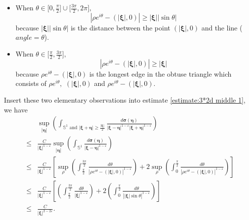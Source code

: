 \documentclass[reqno]{amsart}
\theoremstyle{plain}
\numberwithin{equation}{section}
\begin{document}
\begin{itemize}
\item When $\theta \in \lbrack 0,\frac{\pi }{2}]\cup \lbrack \frac{3\pi }{2},2\pi ],$\begin{equation*}
\left\vert \rho e^{i\theta }-(\left\vert \mathbf{\xi }\right\vert
,0)\right\vert \geqslant \left\vert \mathbf{\xi }\right\vert \left\vert \sin
\theta \right\vert
\end{equation*}because $\left\vert \mathbf{\xi }\right\vert \left\vert \sin \theta
\right\vert $ is the distance between the point $(\left\vert \mathbf{\xi }\right\vert ,0)$ and the line ($angle=\theta $).

\item When $\theta \in \lbrack \frac{\pi }{2},\frac{3\pi }{2}],$\begin{equation*}
\left\vert \rho e^{i\theta }-(\left\vert \mathbf{\xi }\right\vert
,0)\right\vert \geqslant \left\vert \mathbf{\xi }\right\vert
\end{equation*}because $\rho e^{i\theta }-(\left\vert \mathbf{\xi }\right\vert ,0)$ is the
longest edge in the obtuse triangle which consists of $\rho e^{i\theta }\mathbf{,}$ $(\left\vert \mathbf{\xi }\right\vert ,0)$ and $\rho e^{i\theta
}-(\left\vert \mathbf{\xi }\right\vert ,0).$
\end{itemize}

Insert these two elementary observations into estimate \ref{estimate:3*2d
middle 1}, we have 
\begin{eqnarray*}
&&\sup_{\left\vert \mathbf{\eta }\right\vert }\left( \int_{\mathbb{S}^{1}\text{ and }\left\vert \mathbf{\xi }+\mathbf{\eta }\right\vert \geqslant 
\frac{\left\vert \mathbf{\xi }\right\vert }{2}}\frac{d\mathbf{\sigma (\eta )}}{\left\vert \mathbf{\xi }-\mathbf{\eta }\right\vert ^{1-\varepsilon
}\left\vert \mathbf{\xi }+\mathbf{\eta }\right\vert ^{1-\varepsilon }}\right)
\\
&\leqslant &\frac{C}{\left\vert \mathbf{\xi }\right\vert ^{1-\varepsilon }}\sup_{\left\vert \mathbf{\eta }\right\vert }\left( \int_{\mathbb{S}^{1}}\frac{d\mathbf{\sigma (\eta )}}{\left\vert \mathbf{\xi }-\mathbf{\eta }\right\vert ^{1-\varepsilon }}\right) \\
&\leqslant &\frac{C}{\left\vert \mathbf{\xi }\right\vert ^{1-\varepsilon }}\left[ \sup_{\rho }\left( \int_{\frac{\pi }{2}}^{\frac{3\pi }{2}}\frac{d\theta }{\left\vert \rho e^{i\theta }-(\left\vert \mathbf{\xi }\right\vert
,0)\right\vert ^{1-\varepsilon }}\right) +2\sup_{\rho }\left( \int_{0}^{\frac{\pi }{2}}\frac{d\theta }{\left\vert \rho e^{i\theta }-(\left\vert 
\mathbf{\xi }\right\vert ,0)\right\vert ^{1-\varepsilon }}\right) \right] \\
&\leqslant &\frac{C}{\left\vert \mathbf{\xi }\right\vert ^{1-\varepsilon }}\left[ \left( \int_{\frac{\pi }{2}}^{\frac{3\pi }{2}}\frac{d\theta }{\left\vert \mathbf{\xi }\right\vert ^{1-\varepsilon }}\right) +2\left(
\int_{0}^{\frac{\pi }{2}}\frac{d\theta }{\left\vert \left\vert \mathbf{\xi }\right\vert \sin \theta \right\vert ^{1-\varepsilon }}\right) \right] \\
&\leqslant &\frac{C}{\left\vert \mathbf{\xi }\right\vert ^{2-2\varepsilon }}.
\end{eqnarray*}
\end{document}
